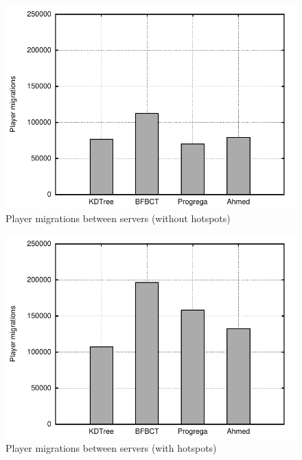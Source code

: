 \documentclass[acmtocl]{acmtrans2m}
\begin{document}
\begin{figure}[!t]
	\centering
	\includegraphics[width=\linewidth]{images/migrations_uniform}
	\caption{Player migrations between servers (without hotspots)}
	\label{fig:migrations:uniform}
\end{figure}

\begin{figure}[!t]
	\centering
	\includegraphics[width=\linewidth]{images/migrations_hotspots}
	\caption{Player migrations between servers (with hotspots)}
	\label{fig:migrations:hotspots}
\end{figure}
\end{document}
